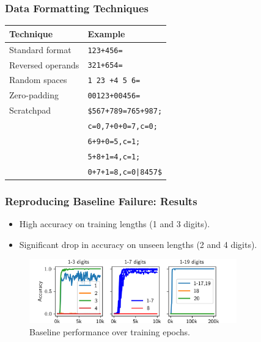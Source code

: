 \documentclass[14pt,aspectratio=169]{beamer}
\theoremstyle{remark}
\begin{document}
\begin{frame}
    \frametitle{Data Formatting Techniques}
    \begin{table}
        \centering
        \begin{tabular}{ll}
            \toprule
            Technique         & Example                     \\
            \midrule
            Standard format   & \texttt{123+456=}           \\
            Reversed operands & \texttt{321+654=}           \\
            Random spaces     & \texttt{1 23 +4  5 6=}      \\
            Zero-padding      & \texttt{00123+00456=}       \\
            Scratchpad        & \texttt{\$567+789=765+987;} \\
                              & \texttt{c=0,7+0+0=7,c=0;}   \\
                              & \texttt{6+9+0=5,c=1;}       \\
                              & \texttt{5+8+1=4,c=1;}       \\
                              & \texttt{0+7+1=8,c=0|8457\$} \\
            \bottomrule
        \end{tabular}
    \end{table}
\end{frame}

\begin{frame}
    \frametitle{Reproducing Baseline Failure: Results}
    \begin{itemize}
        \item High accuracy on training lengths (1 and 3 digits).
        \item Significant drop in accuracy on unseen lengths (2 and 4 digits).
    \end{itemize}
    \begin{figure}
        \centering
        \includegraphics[width=0.8\textwidth]{fig/baseline_and_longer.png}
        \caption{Baseline performance over training epochs.}
    \end{figure}
\end{frame}
\end{document}
